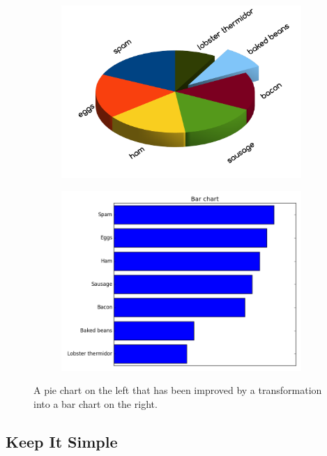 \begin{figure} %
\centering
\begin{subfigure}{.45\textwidth}
\centering
\includegraphics[width=\textwidth]{bad_pie_chart.png}
\end{subfigure}
\begin{subfigure}{.45\textwidth}
\centering
\includegraphics[width=\textwidth]{bar_chart_horizontal_sorted.png}
\end{subfigure}
\caption{A pie chart on the left that has been improved by a transformation into a bar chart on the right.}
\label{fig:pievsbar}
\end{figure}

\subsection*{Keep It Simple} %

